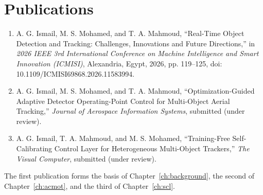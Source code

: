 \chapter*{Publications}

\begin{enumerate}
\item A. G. Ismail, M. S. Mohamed, and T. A. Mahmoud, ``Real-Time Object Detection and Tracking: Challenges, Innovations and Future Directions,'' in \emph{2026 IEEE 3rd International Conference on Machine Intelligence and Smart Innovation (ICMISI)}, Alexandria, Egypt, 2026, pp. 119--125, doi: 10.1109/ICMISI69868.2026.11583994.
\item A. G. Ismail, M. S. Mohamed, and T. A. Mahmoud, ``Optimization-Guided Adaptive Detector Operating-Point Control for Multi-Object Aerial Tracking,'' \emph{Journal of Aerospace Information Systems}, submitted (under review).
\item A. G. Ismail, T. A. Mahmoud, and M. S. Mohamed, ``Training-Free Self-Calibrating Control Layer for Heterogeneous Multi-Object Trackers,'' \emph{The Visual Computer}, submitted (under review).
\end{enumerate}

The first publication forms the basis of Chapter~\ref{ch:background}, the second of Chapter~\ref{ch:acmot}, and the third of Chapter~\ref{ch:scl}.
